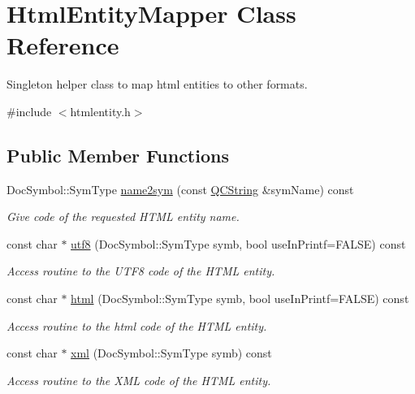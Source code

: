 \hypertarget{class_html_entity_mapper}{}\section{Html\+Entity\+Mapper Class Reference}
\label{class_html_entity_mapper}


Singleton helper class to map html entities to other formats.  




{\ttfamily \#include $<$htmlentity.\+h$>$}

\subsection*{Public Member Functions}
\begin{DoxyCompactItemize}
\item 
Doc\+Symbol\+::\+Sym\+Type \mbox{\hyperlink{class_html_entity_mapper_ae5a015b9df7e2e99420e8fe7d4adbd71}{name2sym}} (const \mbox{\hyperlink{class_q_c_string}{Q\+C\+String}} \&sym\+Name) const
\begin{DoxyCompactList}\small\item\em Give code of the requested H\+T\+ML entity name. \end{DoxyCompactList}\item 
const char $\ast$ \mbox{\hyperlink{class_html_entity_mapper_a4d0e89e08829cb5fbef56e63b145405e}{utf8}} (Doc\+Symbol\+::\+Sym\+Type symb, bool use\+In\+Printf=F\+A\+L\+SE) const
\begin{DoxyCompactList}\small\item\em Access routine to the U\+T\+F8 code of the H\+T\+ML entity. \end{DoxyCompactList}\item 
const char $\ast$ \mbox{\hyperlink{class_html_entity_mapper_a6a779e8427a7ad17c5ff767d7e8c34b6}{html}} (Doc\+Symbol\+::\+Sym\+Type symb, bool use\+In\+Printf=F\+A\+L\+SE) const
\begin{DoxyCompactList}\small\item\em Access routine to the html code of the H\+T\+ML entity. \end{DoxyCompactList}\item 
const char $\ast$ \mbox{\hyperlink{class_html_entity_mapper_a852eee7360169f75ae1a24b5e503bfd9}{xml}} (Doc\+Symbol\+::\+Sym\+Type symb) const
\begin{DoxyCompactList}\small\item\em Access routine to the X\+ML code of the H\+T\+ML entity. \end{DoxyCompactList}\item 

\end{DoxyCompactItemize}
